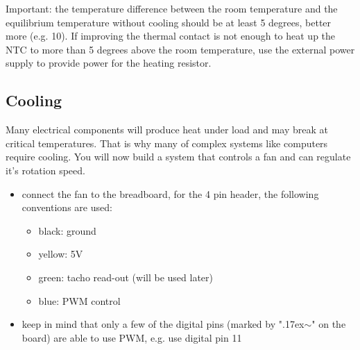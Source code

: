 Important: the temperature difference between the room temperature and the equilibrium temperature without cooling should be at least 5 degrees, better more (e.g. 10). 
If improving the thermal contact is not enough to heat up the NTC to more than 5 degrees above the room temperature, use the external power supply to provide power for the heating resistor.

\vspace{0.2cm}
\begin{center}
\end{center}
\vspace{0.2cm}

\subsection{Cooling}\label{sec:cool}
Many electrical components will produce heat under load and may break at critical temperatures. That is why many of complex systems like computers require cooling. You will now build a system that controls a fan and can regulate it's rotation speed.
\begin{itemize}
	\item connect the fan to the breadboard, for the 4 pin header, the following conventions are used:
	\begin{itemize}
	    \item black: ground
	    \item yellow: 5V
	    \item green: tacho read-out (will be used later)
	    \item blue: PWM control
	\end{itemize}
	\item keep in mind that only a few of the digital pins (marked by "{\raise.17ex\hbox{$\scriptstyle\sim$}}" on the board) are able to use PWM, e.g. use digital pin 11
\end{itemize}

